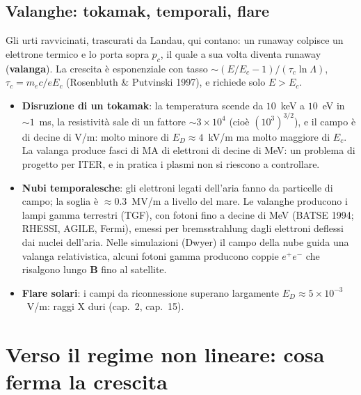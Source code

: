 \subsection{Valanghe: tokamak, temporali, flare}
Gli urti ravvicinati, trascurati da Landau, qui contano: un runaway colpisce un elettrone termico e lo porta sopra $p_c$, il quale a sua volta diventa runaway (\textbf{valanga}). La crescita è esponenziale con tasso $\sim(E/E_c-1)/(\tau_c\ln\Lambda)$, $\tau_c=m_ec/eE_c$ (Rosenbluth \& Putvinski 1997), e richiede solo $E>E_c$.
\begin{itemize}
\item \textbf{Disruzione di un tokamak}: la temperatura scende da $10$~keV a $10$~eV in $\sim1$~ms, la resistività sale di un fattore $\sim3\times10^4$ (cioè $(10^3)^{3/2}$), e il campo è di decine di V/m: molto minore di $E_D\approx4$~kV/m ma molto maggiore di $E_c$. La valanga produce fasci di MA di elettroni di decine di MeV: un problema di progetto per ITER, e in pratica i plasmi non si riescono a controllare.
\item \textbf{Nubi temporalesche}: gli elettroni legati dell'aria fanno da particelle di campo; la soglia è $\approx0.3$~MV/m a livello del mare. Le valanghe producono i lampi gamma terrestri (TGF), con fotoni fino a decine di MeV (BATSE 1994; RHESSI, AGILE, Fermi), emessi per bremsstrahlung dagli elettroni deflessi dai nuclei dell'aria. Nelle simulazioni (Dwyer) il campo della nube guida una valanga relativistica, alcuni fotoni gamma producono coppie $e^+e^-$ che risalgono lungo $\mathbf{B}$ fino al satellite.
\item \textbf{Flare solari}: i campi da riconnessione superano largamente $E_D\approx5\times10^{-3}$~V/m: raggi X duri (cap.~2, cap.~15).
\end{itemize}

\section{Verso il regime non lineare: cosa ferma la crescita}

